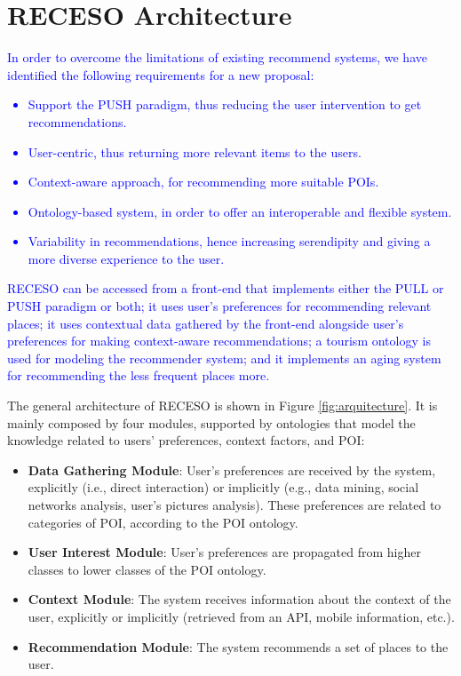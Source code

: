 \section{RECESO Architecture}
\label{sec:proposal}

\textcolor{blue}{In order to overcome the limitations of existing recommend systems, we have identified the following requirements for a new proposal:
\begin{itemize}
    \item Support the PUSH paradigm, thus reducing the user intervention to get recommendations.
    \item User-centric, thus returning more relevant items to the users.
    \item Context-aware approach, for recommending more suitable POIs.
    \item Ontology-based system, in order to offer an interoperable and flexible  system.
    \item Variability in recommendations, hence increasing serendipity and giving a more diverse experience to the user.
\end{itemize}
}

\textcolor{blue}{RECESO can be accessed from a front-end that implements either the PULL or PUSH paradigm or both; it uses user's preferences for recommending relevant places; it uses contextual data gathered by the front-end alongside user's preferences for making context-aware recommendations; a tourism ontology is used for modeling the recommender system; and it implements an aging system for recommending the less frequent places more.}

The general architecture of RECESO is shown in Figure \ref{fig:arquitecture}. It is mainly composed by four modules, supported by ontologies that model the knowledge related to users' preferences, context factors, and POI:  
\begin{itemize}
    \item \textbf{Data Gathering Module}: User's preferences are received by the system, explicitly (i.e., direct interaction) or implicitly (e.g., data mining, social networks analysis, user's pictures analysis). These preferences are related to categories of POI, according to the POI ontology. 
    \item \textbf{User Interest Module}: User's preferences are propagated from higher classes to lower classes of the POI ontology.
    \item \textbf{Context Module}: The system receives information about the context of the user, explicitly or implicitly (retrieved from an API, mobile information, etc.).
    \item \textbf{Recommendation Module}: The system recommends a set of places to the user.
\end{itemize}

